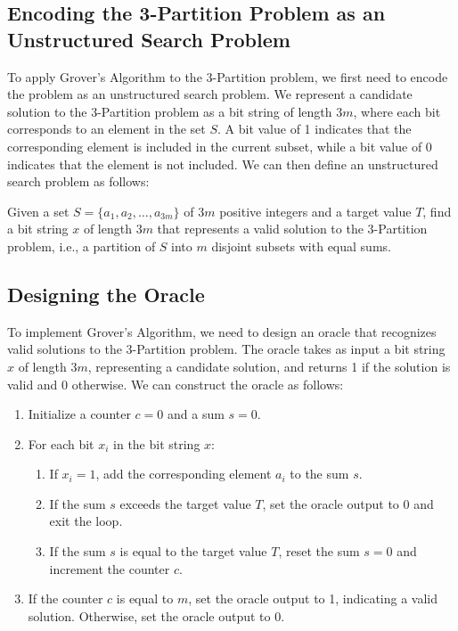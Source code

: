 \subsection{Encoding the 3-Partition Problem as an Unstructured Search Problem}

To apply Grover's Algorithm to the 3-Partition problem, we first need to encode the problem as an unstructured search problem. We represent a candidate solution to the 3-Partition problem as a bit string of length $3m$, where each bit corresponds to an element in the set $S$. A bit value of 1 indicates that the corresponding element is included in the current subset, while a bit value of 0 indicates that the element is not included. We can then define an unstructured search problem as follows:

\begin{problem}
Given a set $S = \{a_1, a_2, \ldots, a_{3m}\}$ of $3m$ positive integers and a target value $T$, find a bit string $x$ of length $3m$ that represents a valid solution to the 3-Partition problem, i.e., a partition of $S$ into $m$ disjoint subsets with equal sums.
\end{problem}

\subsection{Designing the Oracle}

To implement Grover's Algorithm, we need to design an oracle that recognizes valid solutions to the 3-Partition problem. The oracle takes as input a bit string $x$ of length $3m$, representing a candidate solution, and returns 1 if the solution is valid and 0 otherwise. We can construct the oracle as follows:

\begin{enumerate}
    \item Initialize a counter $c = 0$ and a sum $s = 0$.
    \item For each bit $x_i$ in the bit string $x$:
    \begin{enumerate}
        \item If $x_i = 1$, add the corresponding element $a_i$ to the sum $s$.
        \item If the sum $s$ exceeds the target value $T$, set the oracle output to 0 and exit the loop.
        \item If the sum $s$ is equal to the target value $T$, reset the sum $s = 0$ and increment the counter $c$.
    \end{enumerate}
    \item If the counter $c$ is equal to $m$, set the oracle output to 1, indicating a valid solution. Otherwise, set the oracle output to 0.
\end{enumerate}

